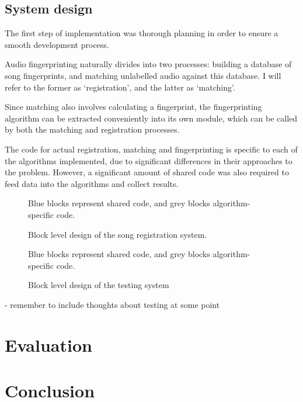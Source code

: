 \documentclass[12pt,a4paper,twoside,openright]{report}
\begin{document}
\section{System design}

The first step of implementation was thorough planning in order to ensure a smooth development process. 

Audio fingerprinting naturally divides into two processes: building a database of song fingerprints, and matching unlabelled audio against this database. I will refer to the former as `registration', and the latter as `matching'.

Since matching also involves calculating a fingerprint, the fingerprinting algorithm can be extracted conveniently into its own module, which can be called by both the matching and registration processes.

The code for actual registration, matching and fingerprinting is specific to each of the algorithms implemented, due to significant differences in their approaches to the problem. However, a significant amount of shared code was also required to feed data into the algorithms and collect results.

\begin{figure}[h]
  \centering
  
  \caption{Block level design of the song registration system.}
  \medskip \small
  Blue blocks represent shared code, and grey blocks algorithm-specific code.
\end{figure}

\begin{figure}[h]
  \centering
  
  \caption{Block level design of the testing system}
  \medskip \small
  Blue blocks represent shared code, and grey blocks algorithm-specific code.
\end{figure}




- remember to include thoughts about testing at some point


\chapter{Evaluation}



\chapter{Conclusion}
\end{document}
